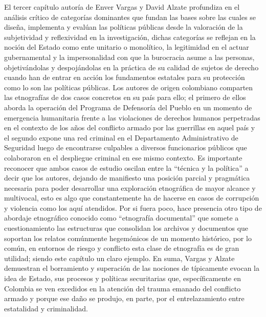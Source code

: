 \documentclass[
  spanish,
  11.5pt,
  170mm x 240mmpaper,
]{scrbook}
\begin{document}
El tercer capítulo autoría de Enver Vargas y David Alzate profundiza en
el análisis crítico de categorías dominantes que fundan las bases sobre
las cuales se diseña, implementa y evalúan las políticas públicas desde
la valoración de la subjetividad y reflexividad en la investigación,
dichas categorías se reflejan en la noción del Estado como ente unitario
o monolítico, la legitimidad en el actuar gubernamental y la
impersonalidad con que la burocracia asume a las personas,
objetivándolas y despojándolas en la práctica de su calidad de sujetos
de derecho cuando han de entrar en acción los fundamentos estatales para
su protección como lo son las políticas públicas. Los autores de origen
colombiano comparten las etnografías de dos casos concretos en su país
para ello; el primero de ellos aborda la operación del Programa de
Defensoría del Pueblo en un momento de emergencia humanitaria frente a
las violaciones de derechos humanos perpetradas en el contexto de los
años del conflicto armado por las guerrillas en aquel país y el segundo
expone una red criminal en el Departamento Administrativo de Seguridad
luego de encontrarse culpables a diversos funcionarios públicos que
colaboraron en el despliegue criminal en ese mismo contexto. Es
importante reconocer que ambos casos de estudio oscilan entre la
``técnica y la política'' a decir que los autores, dejando de manifiesto
una posición parcial y pragmática necesaria para poder desarrollar una
exploración etnográfica de mayor alcance y multivocal, esto es algo que
constantemente ha de hacerse en casos de corrupción y violencia como los
aquí atendidos. Por si fuera poco, hace presencia otro tipo de abordaje
etnográfico conocido como ``etnografía documental'' que somete a
cuestionamiento las estructuras que consolidan los archivos y documentos
que soportan los relatos comúnmente hegemónicos de un momento histórico,
por lo común, en entornos de riesgo y conflicto esta clase de etnografía
es de gran utilidad; siendo este capítulo un claro ejemplo. En suma,
Vargas y Alzate demuestran el borramiento y superación de las nociones
de típicamente evocan la idea de Estado, sus procesos y políticas
securitarias que, específicamente en Colombia se ven excedidos en la
atención del trauma emanado del conflicto armado y porque ese daño se
produjo, en parte, por el entrelazamiento entre estatalidad y
criminalidad.
\end{document}
